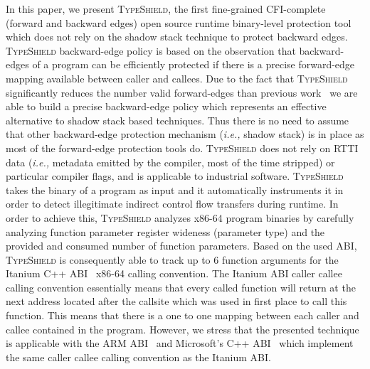 In this paper, we present \textsc{TypeShield}, the first fine-grained CFI-complete (forward and backward edges) open source runtime 
binary-level protection tool which does not rely on the shadow stack technique to protect backward edges.
\textsc{TypeShield} backward-edge policy is based on the observation that backward-edges of a program can be efficiently protected
if there is a precise forward-edge mapping available between caller and callees.
Due to the fact that \textsc{TypeShield} significantly reduces the number valid forward-edges than previous work~\cite{veen:typearmor} we are able 
to build a precise backward-edge policy which represents an effective alternative to shadow stack based techniques.
Thus there is no need to assume that other backward-edge protection mechanism (\textit{i.e.,} shadow stack) is in place as most of the forward-edge protection tools do.
\textsc{TypeShield} does not rely on RTTI data (\textit{i.e.,} metadata emitted by the compiler, most of the time stripped) or particular compiler flags, and is applicable to industrial software.
\textsc{TypeShield} takes the binary of a program as input and it automatically instruments it in order to detect illegitimate indirect control flow transfers during runtime. 
In order to achieve this, 
\textsc{TypeShield} analyzes x86-64 program binaries by carefully analyzing function parameter register wideness (parameter type) and the provided and consumed number of function parameters. 
Based on the used ABI, \textsc{TypeShield} is consequently able to track up to 6 function arguments for the Itanium C++ ABI~\cite{itanium:abi} x86-64 calling convention. 
The Itanium ABI caller callee calling convention essentially means that every called function will return at the next address located after the callsite which was 
used in first place to call this function. This means that there is a one to one mapping between each caller and callee contained in the program.
However, we stress that the presented technique is applicable with the ARM ABI~\cite{arm:abi} and Microsoft's C++ ABI~\cite{microsoft:abi} 
which implement the same caller callee calling convention as the Itanium ABI.

